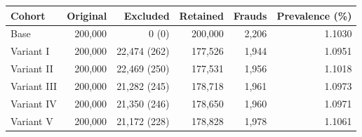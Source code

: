 \begin{tabular}{l r r r r r}
\toprule
Cohort & Original & Excluded & Retained & Frauds & Prevalence (\%) \\
\midrule
Base & 200,000 & 0 (0) & 200,000 & 2,206 & 1.1030 \\
Variant I & 200,000 & 22,474 (262) & 177,526 & 1,944 & 1.0951 \\
Variant II & 200,000 & 22,469 (250) & 177,531 & 1,956 & 1.1018 \\
Variant III & 200,000 & 21,282 (245) & 178,718 & 1,961 & 1.0973 \\
Variant IV & 200,000 & 21,350 (246) & 178,650 & 1,960 & 1.0971 \\
Variant V & 200,000 & 21,172 (228) & 178,828 & 1,978 & 1.1061 \\
\bottomrule
\end{tabular}
